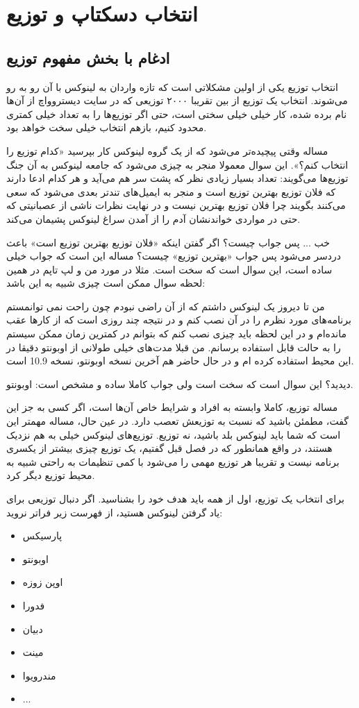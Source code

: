 \section{انتخاب دسکتاپ و توزیع}
\subsection*{\textbf{ادغام با بخش مفهوم توزیع}}
انتخاب توزیع یکی از اولین مشکلاتی است که تازه واردان به لینوکس با آن رو به رو می‌شوند. انتخاب یک توزیع از بین تقریبا ۲۰۰۰ توزیعی که در سایت دیستروواچ از آن‌ها نام برده شده، کار خیلی خیلی سختی است، حتی اگر توزیع‌ها را به تعداد خیلی کمتری محدود کنیم، بازهم انتخاب خیلی سخت خواهد بود.

مساله وقتی پیچیده‌تر می‌شود که از یک گروه لینوکس کار بپرسید «کدام توزیع را انتخاب کنم؟». این سوال معمولا منجر به چیزی می‌شود که جامعه لینوکس به آن جنگ توزیع‌ها می‌گویند: تعداد بسیار زیادی نظر که پشت سر هم می‌آید و هر کدام ادعا دارند که فلان توزیع بهترین توزیع است و منجر به ایمیل‌های تندتر بعدی می‌شود که سعی می‌کنند بگویند چرا فلان توزیع بهترین نیست و در نهایت نظرات ناشی از عصبانیتی که حتی در مواردی خواندنشان آدم را از آمدن سراغ لینوکس پشیمان می‌کند.

خب ... پس جواب چیست؟ اگر گفتن اینکه «فلان توزیع بهترین توزیع است» باعث دردسر می‌شود پس جواب «بهترین توزیع» چیست؟ مساله این است که جواب خیلی ساده است، این سوال است که سخت است. مثلا در مورد من و لپ تاپم در همین لحظه سوال ممکن است چیزی شبیه به این باشد:
\begin{mdframed}
من تا دیروز یک لینوکس داشتم که از آن راضی نبودم چون راحت نمی توانمستم برنامه‌های مورد نظرم را در آن نصب کنم و در نتیجه چند روزی است که از کارها عقب مانده‌ام و در این لحظه باید چیزی نصب کنم که بتوانم در کمترین زمان ممکن سیستم را به حالت قابل استفاده برسانم. من قبلا مدت‌های خیلی طولانی از اوبونتو دقیقا در این محیط استفاده کرده ام و در حال حاضر هم آخرین نسخه اوبونتو، نسخه 10.9 است.
\end{mdframed}
دیدید؟ این سوال است که سخت است ولی جواب کاملا ساده و مشخص است: اوبونتو.

مساله توزیع، کاملا وابسته به افراد و شرایط خاص آن‌ها است، اگر کسی به جز این گفت، مطمئن باشید که نسبت به توزیعش تعصب دارد. در عین حال، مساله مهمتر این است که شما باید لینوکس بلد باشید، نه توزیع. توزیع‌های لینوکس خیلی به هم نزدیک هستند، در واقع همانطور که در فصل قبل گفتیم، یک توزیع چیزی بیشتر از یکسری برنامه نیست و تقریبا هر توزیع مهمی را می‌شود با کمی تنظیمات به راحتی شبیه به محیط توزیع دیگر کرد.

برای انتخاب یک توزیع، اول از همه باید هدف خود را بشناسید. اگر دنبال توزیعی برای یاد گرفتن لینوکس هستید، از فهرست زیر فراتر نروید:
\begin{itemize}
	\item پارسیکس
	\item اوبونتو
	\item اوپن زوزه
	\item فدورا
	\item دبیان
	\item مینت
	\item مندرویوا
	\item ...
\end{itemize}

